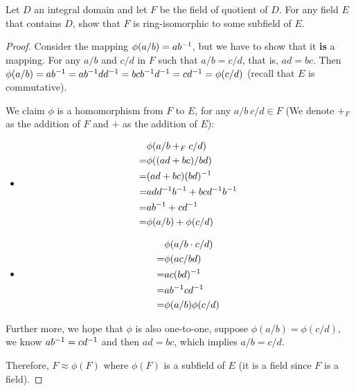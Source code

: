 \documentclass[../main.tex]{subfiles}
\begin{document}
\begin{exercise}
  Let $D$ an integral domain and let $F$ be the field of quotient of $D$.
  For any field $E$ that contains $D$, show that $F$ is ring-isomorphic 
  to some subfield of $E$.
\end{exercise}
\begin{proof}
  Consider the mapping $\phi(a/b) = ab^{-1}$, but we have to show that it \textbf{is} a mapping.
  For any $a/b$ and $c/d$ in $F$ such that $a/b = c/d$, that is, $ad = bc$.
  Then $\phi(a/b) = ab^{-1} = ab^{-1}dd^{-1} = bcb^{-1}d^{-1} = cd^{-1} = \phi(c/d)$
  (recall that $E$ is commutative).

  We claim $\phi$ is a homomorphism from $F$ to $E$, for any $a/b \ c/d \in F$ 
  (We denote $+_F$ as the addition of $F$ and $+$ as the addition of $E$):
  \begin{itemize}
    \item \begin{align*}
       & \phi(a/b +_F c/d) \\
      =& \phi((ad + bc) / bd) \\
      =& (ad + bc)(bd)^{-1} \\
      =& add^{-1}b^{-1} + bcd^{-1}b^{-1} \\
      =& ab^{-1} + cd^{-1} \\
      =& \phi(a/b) + \phi(c/d)
    \end{align*}
    \item \begin{align*}
       & \phi(a/b \cdot c/d) \\
      =& \phi(ac/bd) \\
      =& ac(bd)^{-1} \\
      =& ab^{-1}cd^{-1} \\
      =& \phi(a/b)\phi(c/d)
    \end{align*}
  \end{itemize}

  Further more, we hope that $\phi$ is also one-to-one, suppose $\phi(a/b) = \phi(c/d)$,
  we know $ab^{-1} = cd^{-1}$ and then $ad = bc$, which implies $a/b = c/d$.

  Therefore, $F \approx \phi(F)$ where $\phi(F)$ is a subfield of $E$ (it is a field since $F$ is a field).
\end{proof}
\end{document}
